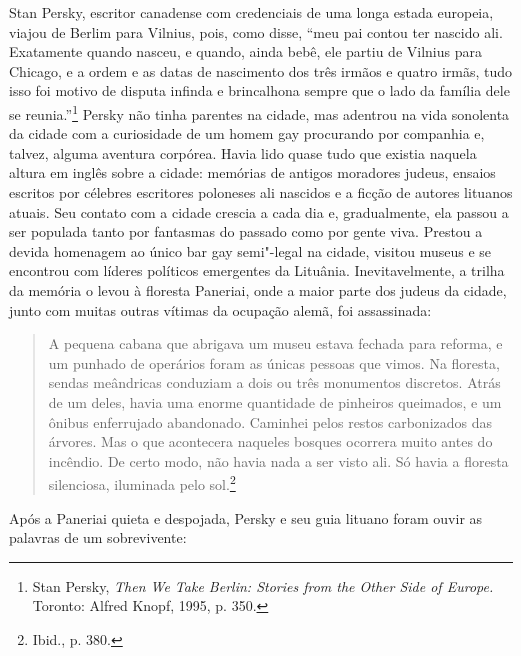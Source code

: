 %

Stan Persky, escritor canadense com credenciais de uma longa estada
europeia, viajou de Berlim para Vilnius, pois, como disse, ``meu pai
contou ter nascido ali. Exatamente quando nasceu, e quando, ainda bebê,
ele partiu de Vilnius para Chicago, e a ordem e as datas de nascimento
dos três irmãos e quatro irmãs, tudo isso foi motivo de disputa infinda
e brincalhona sempre que o lado da família dele se reunia.''\footnote{Stan Persky, \textit{Then We Take Berlin: Stories from the Other Side of Europe.} Toronto: Alfred Knopf, 1995, p. 350.} Persky não tinha parentes na cidade, mas adentrou na vida sonolenta da cidade com a
curiosidade de um homem gay procurando por companhia e, talvez, alguma
aventura corpórea. Havia lido quase tudo que existia naquela altura em
inglês sobre a cidade: memórias de antigos moradores judeus, ensaios
escritos por célebres escritores poloneses ali nascidos e a ficção de
autores lituanos atuais. Seu contato com a cidade crescia a cada dia e,
gradualmente, ela passou a ser populada tanto por fantasmas do passado
como por gente viva. Prestou a devida homenagem ao único bar gay
semi"-legal na cidade, visitou museus e se encontrou com líderes
políticos emergentes da Lituânia. Inevitavelmente, a trilha da memória o
levou à floresta Paneriai, onde a maior parte dos judeus da cidade,
junto com muitas outras vítimas da ocupação alemã, foi assassinada:

\begin{quote}
A pequena cabana que abrigava um museu estava fechada para reforma, e um
punhado de operários foram as únicas pessoas que vimos. Na floresta,
sendas meândricas conduziam a dois ou três monumentos discretos. Atrás
de um deles, havia uma enorme quantidade de pinheiros queimados, e um
ônibus enferrujado abandonado. Caminhei pelos restos carbonizados das
árvores. Mas o que acontecera naqueles bosques ocorrera muito antes do
incêndio. De certo modo, não havia nada a ser visto ali. Só havia a
floresta silenciosa, iluminada pelo sol.\footnote{Ibid., p. 380.}
\end{quote}

Após a Paneriai quieta e despojada, Persky e seu guia lituano foram
ouvir as palavras de um sobrevivente:

